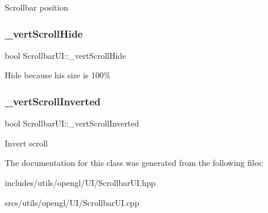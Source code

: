 Scrollbar position \mbox{\label{class_scrollbar_u_i_ab7ce5487caa9ad8b010f800e80685f57}} 
\subsubsection{\texorpdfstring{\+\_\+vert\+Scroll\+Hide}{\_vertScrollHide}}
{\footnotesize\ttfamily bool Scrollbar\+U\+I\+::\+\_\+vert\+Scroll\+Hide\hspace{0.3cm}{\ttfamily [protected]}}

Hide because his size is 100\% \mbox{\label{class_scrollbar_u_i_add30aeb1da25f6cd417680ab0e12652e}} 
\subsubsection{\texorpdfstring{\+\_\+vert\+Scroll\+Inverted}{\_vertScrollInverted}}
{\footnotesize\ttfamily bool Scrollbar\+U\+I\+::\+\_\+vert\+Scroll\+Inverted\hspace{0.3cm}{\ttfamily [protected]}}

Invert scroll 

The documentation for this class was generated from the following files\+:\begin{DoxyCompactItemize}
\item 
includes/utils/opengl/\+U\+I/Scrollbar\+U\+I.\+hpp\item 
srcs/utils/opengl/\+U\+I/Scrollbar\+U\+I.\+cpp\end{DoxyCompactItemize}
